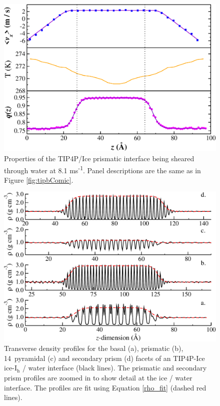 \begin{figure}
\includegraphics[width=\linewidth]{Figures/Pyra_TIP4PIce_Plot}
\caption{\label{fig:tippyComic} Properties of the TIP4P/Ice prismatic
  interface being sheared through water at 8.1 ms\textsuperscript{-1}.
  Panel descriptions are the same as in Figure \ref{fig:tipbComic}.}
\end{figure}


\begin{figure}
\includegraphics[width=\linewidth]{Figures/TIPtransDensity}
\caption{\label{fig:TIPtransDensity} Transverse density profiles for the
  basal (a), prismatic (b), 14\degree~pyramidal (c) and secondary prism (d)
  facets of an TIP4P-Ice ice-I$_\mathrm{h}$ / water interface (black
  lines). The prismatic and secondary prism profiles are zoomed in to
  show detail at the ice / water interface. The profiles are fit using
  Equation \eqref{rho_fit} (dashed red lines). }
\end{figure}